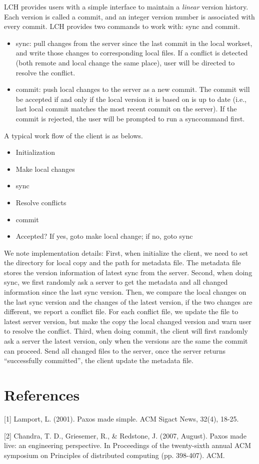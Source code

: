 \documentclass[11pt]{article}
\begin{document}
LCH provides users with a simple interface to maintain a \emph{linear} version history. Each version is called a commit, and an integer version number is associated with every commit. LCH provides two commands to work with: sync and commit. 
\begin{itemize}
  \item sync: pull changes from the server since the last commit in the local workset, and write those changes to corresponding local files. If a conflict is detected (both remote and local change the same place), user will be directed to resolve the conflict.
  \item commit: push local changes to the server as a new commit. The commit will be accepted if and only if the local version it is based on is up to date (i.e., last local commit matches the most recent commit on the server). If the commit is rejected, the user will be prompted to run a synccommand first.
\end{itemize}
A typical work flow of the client is as belows.
\begin{itemize}
  \item Initialization
  \item Make local changes
  \item sync
  \item Resolve conflicts
  \item commit
  \item Accepted? If yes, goto make local change; if no, goto sync
\end{itemize}

We note implementation details: First, when initialize the client, we need to set the directory for local copy and the path for metadata file. The metadata file stores the version information of latest sync from the server. Second, when doing sync, we first randomly ask a server to get the metadata and all changed information since the last sync version. Then, we compare the local changes on the last sync version and the changes of the latest version, if the two changes are different, we report a conflict file. For each conflict file, we update the file to latest server version, but make the copy the local changed version and warn user to resolve the conflict. Third, when doing commit, the client will first randomly ask a server the latest version, only when the versions are the same the commit can proceed. Send all changed files to the server, once the server returns ``successfully committed'', the client update the metadata file.

\section{References}

[1] Lamport, L. (2001). Paxos made simple. ACM Sigact News, 32(4), 18-25.

[2] Chandra, T. D., Griesemer, R., \& Redstone, J. (2007, August). Paxos made live: an engineering perspective. In Proceedings of the twenty-sixth annual ACM symposium on Principles of distributed computing (pp. 398-407). ACM.
\end{document}
